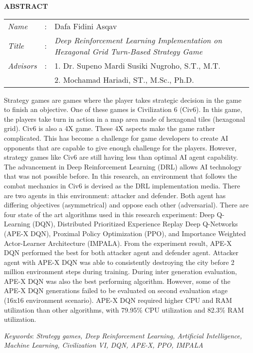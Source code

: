 \begin{center}
  \large\textbf{ABSTRACT}
\end{center}


\vspace{2ex}

\begingroup
  \setlength{\tabcolsep}{0pt}

  \noindent
  \begin{tabularx}{\textwidth}{l >{\centering}m{3em} X}
    \emph{Name}     &:& Dafa Fidini Asqav \\

    \emph{Title}    &:& \emph{Deep Reinforcement Learning Implementation on Hexagonal Grid Turn-Based Strategy Game} \\

    \emph{Advisors} &:& 1. Dr. Supeno Mardi Susiki Nugroho, S.T., M.T. \\
                    & & 2. Mochamad Hariadi, ST., M.Sc., Ph.D. \\
  \end{tabularx}
\endgroup

Strategy games are games where the player takes strategic decision in the game to finish an objective.
One of these games is Civilization 6 (Civ6).
In this game, the players take turn in action in a map area made of hexagonal tiles (hexagonal grid).
Civ6 is also a 4X game. These 4X aspects make the game rather complicated.
This has become a challenge for game developers to create AI opponents that are capable to give enough challenge for the players.
However, strategy games like Civ6 are still having less than optimal AI agent capability.
The advancement in Deep Reinforcement Learning (DRL) allows AI technology that was not possible before.
In this research, an environment that follows the combat mechanics in Civ6 is devised as the
DRL implementation media. There are two agents in this environment: attacker and defender.
Both agent has differing objectives (asymmetrical) and oppose each other (adversarial).
There are four state of the art algorithms used in this research experiment: Deep Q-Learning (DQN), Distributed Prioritized Experience Replay Deep Q-Networks (APE-X DQN),
Proximal Policy Optimization (PPO), and Importance Weighted Actor-Learner Architecture (IMPALA).
From the experiment result, APE-X DQN performed the best for both attacker agent and defender agent.
Attacker agent with APE-X DQN was able to consistently destroying the city before 2 million environment steps during training.
During inter generation evaluation, APE-X DQN was also the best performing algorithm.
However, some of the APE-X DQN generations failed to be evaluated on second evaluation stage (16x16 environment scenario).
APE-X DQN required higher CPU and RAM utilization than other algorithms,
with 79.95\% CPU utilization and 82.3\% RAM utilization.

\emph{Keywords}: \emph{Strategy games, Deep Reinforcement Learning, Artificial Intelligence, Machine Learning, Civilization VI, DQN, APE-X, PPO, IMPALA}

